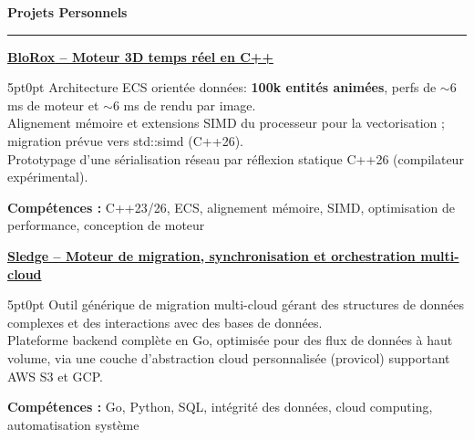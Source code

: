 \documentclass[9pt]{extarticle}
\begin{document}
\par\vspace{5pt}

{\large\bfseries Projets Personnels}
\par\vspace{-8pt}
\rule{\linewidth}{0.4pt}
\par\vspace{5pt}

\underline{\bfseries \href{https://github.com/paulogarithm/blorox}{BloRox} -- Moteur 3D temps réel en C++}
\par
\begin{adjustwidth}{5pt}{0pt}
	Architecture ECS orientée données: {\bfseries 100k entités animées}, perfs de $\sim$6 ms de moteur et $\sim$6 ms de rendu par image. \\
	Alignement mémoire et extensions SIMD du processeur pour la vectorisation ; migration prévue vers {\ttfamily std::simd} (C++26). \\
	Prototypage d'une sérialisation réseau par réflexion statique C++26 (compilateur expérimental).
\end{adjustwidth}
\par
{\bfseries Compétences :} C++23/26, ECS, alignement mémoire, SIMD, optimisation de performance, conception de moteur

\par\vspace{8pt}

\underline{\bfseries Sledge -- Moteur de migration, synchronisation et orchestration multi-cloud}
\par
\begin{adjustwidth}{5pt}{0pt}
    Outil générique de migration multi-cloud gérant des structures de données complexes et des interactions avec des bases de données. \\
    Plateforme backend complète en Go, optimisée pour des flux de données à haut volume, via une couche d'abstraction cloud personnalisée ({\ttfamily provicol}) supportant AWS S3 et GCP.
\end{adjustwidth}
\par
{\bfseries Compétences :} Go, Python, SQL, intégrité des données, cloud computing, automatisation système

\par\vspace{8pt}
\end{document}
